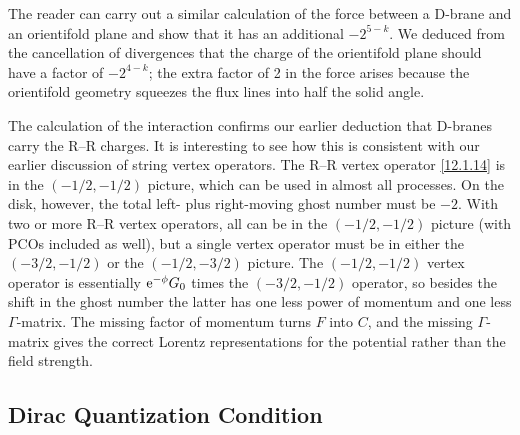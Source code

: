 The reader can carry out a similar calculation of the force between a D-brane and an orientifold plane and show that it has an additional $-2^{5-k}$. We deduced from the cancellation of divergences that the charge of the orientifold plane should have a factor of $-2^{4-k}$; the extra factor of 2 in the force arises because the orientifold geometry squeezes the flux lines into half the solid angle.

The calculation of the interaction confirms our earlier deduction that D-branes carry the R--R charges. It is interesting to see how this is consistent with our earlier discussion of string vertex operators. The R--R vertex operator \eqref{12.1.14} is in the $(-1/2, -1/2)$ picture, which can be used in almost all processes. On the disk, however, the total left- plus right-moving ghost number must be $-2$. With two or more R--R vertex operators, all can be in the $(-1/2, -1/2)$ picture (with PCOs included as well), but a single vertex operator must be in either the $(-3/2, -1/2)$ or the $(-1/2, -3/2)$ picture. The $(-1/2, -1/2)$ vertex operator is essentially $\mathrm{e}^{-\phi}G_0$ times the $(-3/2, -1/2)$ operator, so besides the shift in the ghost number the latter has one less power of momentum and one less $\Gamma$-matrix. The missing factor of momentum turns $F$ into $C$, and the missing $\Gamma$-matrix gives the correct Lorentz representations for the potential rather than the field strength.

\subsection*{Dirac Quantization Condition}

